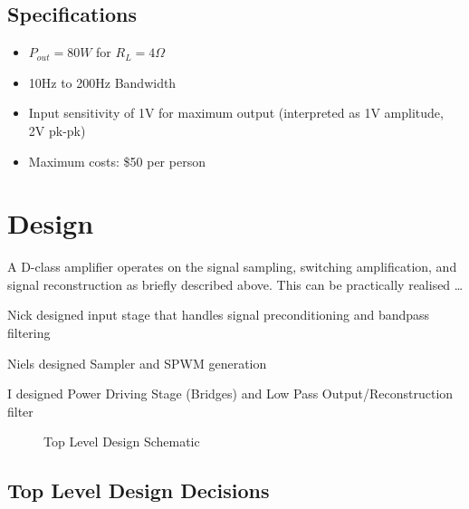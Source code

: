 \documentclass[11pt]{article}
\begin{document}
{\subsection*{Specifications}\label{S:spec}
\begin{itemize}
  \item $P_{out}=80W$ for $R_{L} = 4\Omega$
  \item 10Hz to 200Hz Bandwidth
  \item Input sensitivity of 1V for maximum output (interpreted as 1V amplitude, 2V pk-pk)
  \item Maximum costs: \$50 per person
\end{itemize}

\section{Design}

A D-class amplifier operates on the signal sampling, switching amplification, and signal reconstruction as briefly described above. This can be practically realised \dots

Nick designed input stage that handles signal preconditioning and bandpass filtering

Niels designed Sampler and SPWM generation

I designed Power Driving Stage (Bridges) and Low Pass Output/Reconstruction filter


\begin{figure}[h!]
  \centering
    \caption{Top Level Design Schematic}
  \label{F:top_schem}
\end{figure}

\subsection{Top Level Design Decisions}

}
\end{document}
